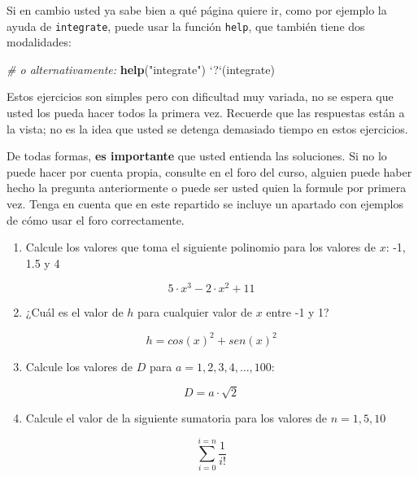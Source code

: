 \documentclass[]{article}
\newenvironment{Shaded}{}{}
\newcommand{\KeywordTok}[1]{\textcolor[rgb]{0.00,0.44,0.13}{\textbf{{#1}}}}
\newcommand{\DataTypeTok}[1]{\textcolor[rgb]{0.56,0.13,0.00}{{#1}}}
\newcommand{\StringTok}[1]{\textcolor[rgb]{0.25,0.44,0.63}{{#1}}}
\newcommand{\CommentTok}[1]{\textcolor[rgb]{0.38,0.63,0.69}{\textit{{#1}}}}
\newcommand{\NormalTok}[1]{{#1}}
\begin{document}
Si en cambio usted ya sabe bien a qué página quiere ir, como por ejemplo
la ayuda de \texttt{integrate}, puede usar la función \texttt{help}, que
también tiene dos modalidades:

\begin{Shaded}
\begin{Highlighting}[]
\CommentTok{# o alternativamente:}
\KeywordTok{help}\NormalTok{(}\StringTok{"integrate"}\NormalTok{)}
\StringTok{`}\DataTypeTok{?}\StringTok{`}\NormalTok{(integrate)}
\end{Highlighting}
\end{Shaded}
Estos ejercicios son simples pero con dificultad muy variada, no se
espera que usted los pueda hacer todos la primera vez. Recuerde que las
respuestas están a la vista; no es la idea que usted se detenga
demasiado tiempo en estos ejercicios.

De todas formas, \textbf{es importante} que usted entienda las
soluciones. Si no lo puede hacer por cuenta propia, consulte en el foro
del curso, alguien puede haber hecho la pregunta anteriormente o puede
ser usted quien la formule por primera vez. Tenga en cuenta que en este
repartido se incluye un apartado con ejemplos de cómo usar el foro
correctamente.

\begin{enumerate}[1.]
\item
  Calcule los valores que toma el siguiente polinomio para los valores
  de $x$: -1, 1.5 y 4
\end{enumerate}
\[
  5 \cdot x ^ 3 - 2 \cdot x ^ 2 + 11
\]

\begin{enumerate}[1.]
\setcounter{enumi}{1}
\item
  ¿Cuál es el valor de $h$ para cualquier valor de $x$ entre -1 y 1?
\end{enumerate}
\[
  h = cos(x) ^ 2 + sen(x) ^ 2
\]

\begin{enumerate}[1.]
\setcounter{enumi}{2}
\item
  Calcule los valores de $D$ para $a = 1, 2, 3, 4, ..., 100$:
\end{enumerate}
\[
  D = a \cdot \sqrt{2}
\]

\begin{enumerate}[1.]
\setcounter{enumi}{3}
\item
  Calcule el valor de la siguiente sumatoria para los valores de
  $n = 1, 5, 10$
\end{enumerate}
\[
  \sum_{i = 0} ^{i = n} \frac{1}{i!}
\]
\end{document}
